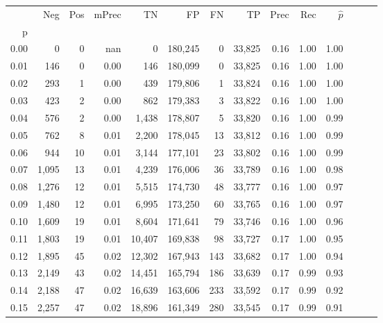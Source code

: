 \begin{tabular}{rrrrrrrrrrrrrr}
\toprule
{} &    Neg &  Pos & mPrec &       TN &       FP &      FN &      TP &  Prec &   Rec & $\hat{p}$ \\
p    &        &      &       &          &          &         &         &       &       &           \\
\midrule
0.00 &      0 &    0 &   nan &        0 &  180,245 &       0 &  33,825 &  0.16 &  1.00 &      1.00 \\
0.01 &    146 &    0 &  0.00 &      146 &  180,099 &       0 &  33,825 &  0.16 &  1.00 &      1.00 \\
0.02 &    293 &    1 &  0.00 &      439 &  179,806 &       1 &  33,824 &  0.16 &  1.00 &      1.00 \\
0.03 &    423 &    2 &  0.00 &      862 &  179,383 &       3 &  33,822 &  0.16 &  1.00 &      1.00 \\
0.04 &    576 &    2 &  0.00 &    1,438 &  178,807 &       5 &  33,820 &  0.16 &  1.00 &      0.99 \\
0.05 &    762 &    8 &  0.01 &    2,200 &  178,045 &      13 &  33,812 &  0.16 &  1.00 &      0.99 \\
0.06 &    944 &   10 &  0.01 &    3,144 &  177,101 &      23 &  33,802 &  0.16 &  1.00 &      0.99 \\
0.07 &  1,095 &   13 &  0.01 &    4,239 &  176,006 &      36 &  33,789 &  0.16 &  1.00 &      0.98 \\
0.08 &  1,276 &   12 &  0.01 &    5,515 &  174,730 &      48 &  33,777 &  0.16 &  1.00 &      0.97 \\
0.09 &  1,480 &   12 &  0.01 &    6,995 &  173,250 &      60 &  33,765 &  0.16 &  1.00 &      0.97 \\
0.10 &  1,609 &   19 &  0.01 &    8,604 &  171,641 &      79 &  33,746 &  0.16 &  1.00 &      0.96 \\
0.11 &  1,803 &   19 &  0.01 &   10,407 &  169,838 &      98 &  33,727 &  0.17 &  1.00 &      0.95 \\
0.12 &  1,895 &   45 &  0.02 &   12,302 &  167,943 &     143 &  33,682 &  0.17 &  1.00 &      0.94 \\
0.13 &  2,149 &   43 &  0.02 &   14,451 &  165,794 &     186 &  33,639 &  0.17 &  0.99 &      0.93 \\
0.14 &  2,188 &   47 &  0.02 &   16,639 &  163,606 &     233 &  33,592 &  0.17 &  0.99 &      0.92 \\
0.15 &  2,257 &   47 &  0.02 &   18,896 &  161,349 &     280 &  33,545 &  0.17 &  0.99 &      0.91 \\

\end{tabular}

